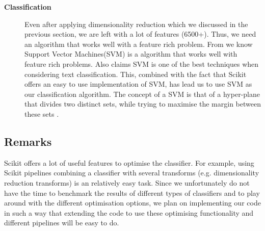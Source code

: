 \begin{description}
\item[\textbf{Classification}]
Even after applying dimensionality reduction which we discussed in the previous section, we are left with a lot of features (6500+). Thus, we need an algorithm that works well with a feature rich problem. From \cite{MLCheatSheet} we know Support Vector Machines(SVM) is a algorithm that works well with feature rich problems. Also \cite{ml_text} claims SVM is one of the best techniques when considering text classification. This, combined with the fact that Scikit offers an easy to use implementation of SVM, has lead us to use SVM as our classification algorithm. The concept of a SVM is that of a hyper-plane that divides two distinct sets, while trying to maximise the margin between these sets \cite{tong2001support}.
\end{description}

\subsection{Remarks}
Scikit offers a lot of useful features to optimise the classifier. For example, using Scikit pipelines combining a classifier with several transforms (e.g. dimensionality reduction transforms) is an relatively easy task. Since we unfortunately do not have the time to benchmark the results of different types of classifiers and to play around with the different optimisation options, we plan on implementing our code in such a way that extending the code to use these optimising functionality and different pipelines will be easy to do.
